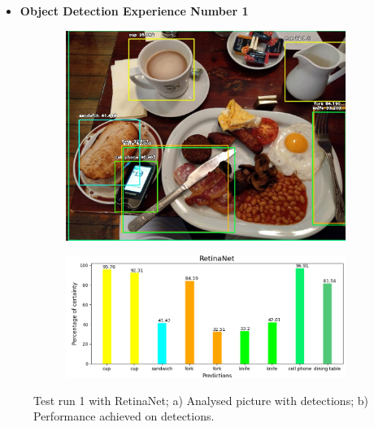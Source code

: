 \newpage
    
  \begin{itemize}
    \item \textbf{Object Detection Experience Number 1}
  \end{itemize}

    

      \begin{figure}[H]
        \centering
        \captionsetup{justification=centering}

        \begin{subfigure}{0.29\textwidth}
        \includegraphics[width=\textwidth]{Sections/4InitialWork/4_images_obj_run1/retinaNet.jpg} 
        \caption{}
        \end{subfigure}
        \begin{subfigure}{0.65\textwidth}
        \includegraphics[width=\textwidth]{Sections/4InitialWork/4_images_obj_run1/retinaNet_graph.png}
        \caption{}
      
        \end{subfigure}
        
        \caption[Test run 1 with RetinaNet]{ 
        Test run 1 with RetinaNet; a) Analysed picture with detections; b) Performance achieved on detections. }
        \label{fig:retina_1}
        \end{figure}
    

